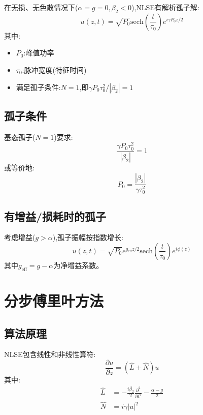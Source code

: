 \documentclass[12pt,a4paper]{article}
\theoremstyle{definition}
\begin{document}
在无损、无色散情况下($\alpha=g=0,\beta_2<0$),NLSE有解析孤子解:
\begin{equation}
\boxed{u(z,t)=\sqrt{P_0}\text{sech}\left(\frac{t}{\tau_0}\right)e^{i\gamma P_0z/2}}
\end{equation}
其中:
\begin{itemize}
    \item $P_0$:峰值功率
    \item $\tau_0$:脉冲宽度(特征时间)
    \item 满足孤子条件:$N=1$,即$\gamma P_0\tau_0^2/|\beta_2|=1$
\end{itemize}

\subsection{孤子条件}

基态孤子($N=1$)要求:
\begin{equation}
\boxed{\frac{\gamma P_0\tau_0^2}{|\beta_2|}=1}
\label{eq:soliton_condition}
\end{equation}
或等价地:
\begin{equation}
P_0=\frac{|\beta_2|}{\gamma\tau_0^2}
\end{equation}

\subsection{有增益/损耗时的孤子}

考虑增益($g>\alpha$),孤子振幅按指数增长:
\begin{equation}
u(z,t)=\sqrt{P_0}e^{g_{\text{eff}}z/2}\text{sech}\left(\frac{t}{\tau_0}\right)e^{i\phi(z)}
\end{equation}
其中$g_{\text{eff}}=g-\alpha$为净增益系数。

\section{分步傅里叶方法}

\subsection{算法原理}

NLSE包含线性和非线性算符:
\begin{equation}
\frac{\partial u}{\partial z}=(\hat{L}+\hat{N})u
\end{equation}
其中:
\begin{align}
\hat{L}&=-\frac{i\beta_2}{2}\frac{\partial^2}{\partial t^2}-\frac{\alpha-g}{2}\\
\hat{N}&=i\gamma|u|^2
\end{align}
\end{document}
